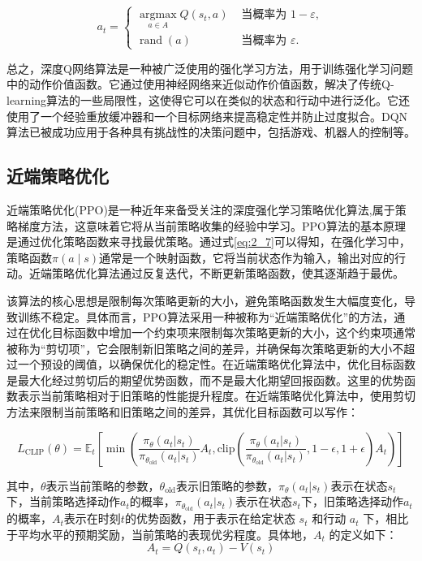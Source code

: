 \begin{equation}
\label{eq:2_23}
{a}_{t}= \begin{cases}\underset{{a} \in A}{\operatorname{argmax}} Q\left({s}_{t} ,{a}\right) & \text { 当概率为 } 1-\varepsilon, \\ \operatorname{rand}({a}) & \text { 当概率为 } \varepsilon.\end{cases}
\end{equation}


总之，深度Q网络算法是一种被广泛使用的强化学习方法，用于训练强化学习问题中的动作价值函数。它通过使用神经网络来近似动作价值函数，解决了传统Q-learning算法的一些局限性，这使得它可以在类似的状态和行动中进行泛化。它还使用了一个经验重放缓冲器和一个目标网络来提高稳定性并防止过度拟合。DQN算法已被成功应用于各种具有挑战性的决策问题中，包括游戏、机器人的控制等。


\subsection{近端策略优化}

近端策略优化(PPO)是一种近年来备受关注的深度强化学习策略优化算法,属于策略梯度方法，这意味着它将从当前策略收集的经验中学习。PPO算法的基本原理是通过优化策略函数来寻找最优策略。通过式\ref{eq:2_7}可以得知，在强化学习中，策略函数$\pi(a \mid s)$通常是一个映射函数，它将当前状态作为输入，输出对应的行动。近端策略优化算法通过反复迭代，不断更新策略函数，使其逐渐趋于最优。

该算法的核心思想是限制每次策略更新的大小，避免策略函数发生大幅度变化，导致训练不稳定。具体而言，PPO算法采用一种被称为“近端策略优化”的方法，通过在优化目标函数中增加一个约束项来限制每次策略更新的大小，这个约束项通常被称为“剪切项”，它会限制新旧策略之间的差异，并确保每次策略更新的大小不超过一个预设的阈值，以确保优化的稳定性。在近端策略优化算法中，优化目标函数是最大化经过剪切后的期望优势函数，而不是最大化期望回报函数。这里的优势函数表示当前策略相对于旧策略的性能提升程度。在近端策略优化算法中，使用剪切方法来限制当前策略和旧策略之间的差异，其优化目标函数可以写作：

\begin{equation}
\label{eq:2_24}
L_{\text{CLIP}}(\theta) = \mathbb{E}_t\left[\min\left(\frac{\pi_{\theta}(a_t|s_t)}{\pi_{\theta_{\text{old}}}(a_t|s_t)}A_t, \text{clip}\left(\frac{\pi_{\theta}(a_t|s_t)}{\pi_{\theta_{\text{old}}}(a_t|s_t)}, 1-\epsilon, 1+\epsilon\right)A_t\right)\right]
\end{equation}

其中，$\theta$表示当前策略的参数，$\theta_{\text{old}}$表示旧策略的参数，$\pi_{\theta}(a_t|s_t)$表示在状态$s_t$下，当前策略选择动作$a_t$的概率，$\pi_{\theta_{\text{old}}}(a_t|s_t)$表示在状态$s_t$下，旧策略选择动作$a_t$的概率，$A_t$表示在时刻$t$的优势函数，用于表示在给定状态 $s_t$ 和行动 $a_t$ 下，相比于平均水平的预期奖励，当前策略的表现优劣程度。具体地，$A_t$ 的定义如下：
\begin{equation}
\label{eq:2_25}
A_t = Q(s_t, a_t) - V(s_t)
\end{equation}

